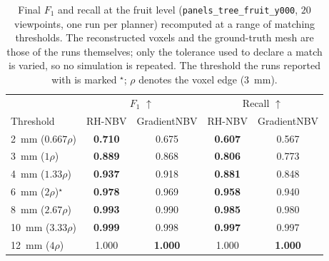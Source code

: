 \begin{table}[H]
\centering
\caption{Final $F_1$ and recall at the fruit level (\texttt{panels\_tree\_fruit\_y000}, $20$ viewpoints, one run per planner) recomputed at a range of matching thresholds. The reconstructed voxels and the ground-truth mesh are those of the runs themselves; only the tolerance used to declare a match is varied, so no simulation is repeated. The threshold the runs reported with is marked $^{\star}$; $\rho$ denotes the voxel edge (\SI{3}{\milli\metre}).}
\label{tab:f1-threshold-sweep}
\begin{tabular}{l|cc|cc}
\toprule
 & \multicolumn{2}{c|}{$F_1$ $\uparrow$} & \multicolumn{2}{c}{Recall $\uparrow$} \\
Threshold & RH-NBV & GradientNBV & RH-NBV & GradientNBV \\
\midrule
\SI{2}{\milli\metre} ($0.667\rho$) & \textbf{0.710} & 0.675 & \textbf{0.607} & 0.567 \\
\SI{3}{\milli\metre} ($1\rho$) & \textbf{0.889} & 0.868 & \textbf{0.806} & 0.773 \\
\SI{4}{\milli\metre} ($1.33\rho$) & \textbf{0.937} & 0.918 & \textbf{0.881} & 0.848 \\
\SI{6}{\milli\metre} ($2\rho$)$^{\star}$ & \textbf{0.978} & 0.969 & \textbf{0.958} & 0.940 \\
\SI{8}{\milli\metre} ($2.67\rho$) & \textbf{0.993} & 0.990 & \textbf{0.985} & 0.980 \\
\SI{10}{\milli\metre} ($3.33\rho$) & \textbf{0.999} & 0.998 & \textbf{0.997} & 0.997 \\
\SI{12}{\milli\metre} ($4\rho$) & 1.000 & \textbf{1.000} & 1.000 & \textbf{1.000} \\
\bottomrule
\end{tabular}
\end{table}
